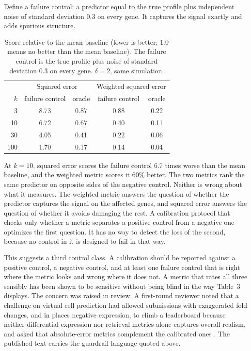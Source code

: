 \documentclass[11pt]{article}
\theoremstyle{definition}
\begin{document}
Define a failure control: a predictor equal to the true profile plus independent noise of standard deviation $0.3$ on every gene. It captures the signal exactly and adds spurious structure.

\begin{table}[t]
\centering
\caption{Score relative to the mean baseline (lower is better; $1.0$ means no better than the mean baseline). The failure control is the true profile plus noise of standard deviation $0.3$ on every gene. $\delta=2$, same simulation.}
\begin{tabular}{rcccc}
\toprule
 & \multicolumn{2}{c}{Squared error} & \multicolumn{2}{c}{Weighted squared error} \\
$k$ & failure control & oracle & failure control & oracle \\
\midrule
3   & 8.73 & 0.87 & 0.88 & 0.22 \\
10  & 6.72 & 0.67 & 0.40 & 0.11 \\
30  & 4.05 & 0.41 & 0.22 & 0.06 \\
100 & 1.70 & 0.17 & 0.14 & 0.04 \\
\bottomrule
\end{tabular}
\end{table}

At $k=10$, squared error scores the failure control $6.7$ times worse than the mean baseline, and the weighted metric scores it $60\%$ better. The two metrics rank the same predictor on opposite sides of the negative control. Neither is wrong about what it measures. The weighted metric answers the question of whether the predictor captures the signal on the affected genes, and squared error answers the question of whether it avoids damaging the rest. A calibration protocol that checks only whether a metric separates a positive control from a negative one optimizes the first question. It has no way to detect the loss of the second, because no control in it is designed to fail in that way.

This suggests a third control class. A calibration should be reported against a positive control, a negative control, and at least one failure control that is right where the metric looks and wrong where it does not. A metric that rates all three sensibly has been shown to be sensitive without being blind in the way Table~3 displays. The concern was raised in review. A first-round reviewer noted that a challenge on virtual cell prediction had allowed submissions with exaggerated fold changes, and in places negative expression, to climb a leaderboard because neither differential-expression nor retrieval metrics alone captures overall realism, and asked that absolute-error metrics complement the calibrated ones \citep{miller2026peer}. The published text carries the guardrail language quoted above.
\end{document}
